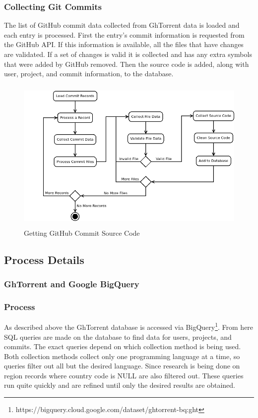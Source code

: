 \documentclass[12pt]{article}
\begin{document}
\subsubsection*{Collecting Git Commits}
The list of GitHub commit data collected from GhTorrent data is loaded and each entry is processed. First the entry's commit information is requested from the GitHub API. If this information is available, all the files that have changes are validated. If a set of changes is valid it is collected and has any extra symbols that were added by GitHub removed. Then the source code is added, along with user, project, and commit information, to the database.

\begin{figure}[t]
    \centering
    \includegraphics[height=7.5cm]{diagrams/commits.png}
    \caption{Getting GitHub Commit Source Code}
\end{figure}


\subsection{Process Details}


\subsubsection{GhTorrent and Google BigQuery}

\subsubsection*{Process}
As described above the GhTorrent database is accessed via BigQuery\footnote{https://bigquery.cloud.google.com/dataset/ghtorrent-bq:ght}. From here SQL queries are made on the database to find data for users, projects, and commits. The exact queries depend on which collection method is being used. Both collection methods collect only one programming language at a time, so queries filter out all but the desired language. Since research is being done on region records where country code is NULL are also filtered out. These queries run quite quickly and are refined until only the desired results are obtained.
\end{document}
